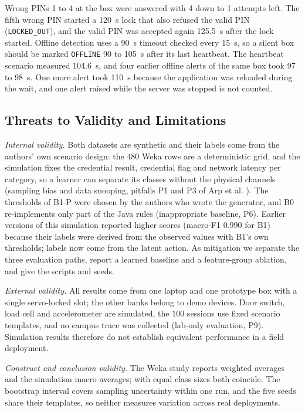\documentclass[journal,onecolumn]{IEEEtran}
\begin{document}
Wrong PINs 1 to 4 at the box were answered with 4 down to 1 attempts left. The fifth wrong PIN started a 120~s lock
that also refused the valid PIN (\texttt{LOCKED\_OUT}), and the valid PIN was accepted again 125.5~s after the lock
started. Offline detection uses a 90~s timeout checked every 15~s, so a silent box should be marked \texttt{OFFLINE}
90 to 105~s after its last heartbeat. The heartbeat scenario measured 104.6~s, and four earlier offline alerts of the
same box took 97 to 98~s. One more alert took 110~s because the application was reloaded during the wait, and one alert
raised while the server was stopped is not counted.

\subsection{Threats to Validity and Limitations}
\label{sec:limits}

\textit{Internal validity.} Both datasets are synthetic and their labels come from the authors' own scenario design:
the 480 Weka rows are a deterministic grid, and the simulation fixes the credential result, credential flag and network
latency per category, so a learner can separate its classes without the physical channels (sampling bias and data
snooping, pitfalls P1 and P3 of Arp et al. \cite{arp2022dos}). The thresholds of B1-P were chosen by the authors who
wrote the generator, and B0 re-implements only part of the Java rules (inappropriate baseline, P6). Earlier versions of
this simulation reported higher scores (macro-F1 0.990 for B1) because their labels were derived from the observed
values with B1's own thresholds; labels now come from the latent action. As mitigation we separate the three
evaluation paths, report a learned baseline and a feature-group ablation, and give the scripts and seeds.

\textit{External validity.} All results come from one laptop and one prototype box with a single servo-locked slot;
the other banks belong to demo devices. Door switch, load cell and accelerometer are simulated, the 100 sessions use
fixed scenario templates, and no campus trace was collected (lab-only evaluation, P9). Simulation results therefore do
not establish equivalent performance in a field deployment.

\textit{Construct and conclusion validity.} The Weka study reports weighted averages and the simulation macro
averages; with equal class sizes both coincide. The bootstrap interval covers sampling uncertainty within one run, and
the five seeds share their templates, so neither measures variation across real deployments.
\end{document}
